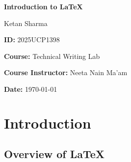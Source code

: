 \documentclass[12pt,a4paper]{report}
\begin{document}
	
	\begin{titlepage}
		\thispagestyle{empty}
		
		\begin{center}
			
			\vspace*{2cm}
			
			{\Huge\bfseries Introduction to LaTeX}
			
			\vspace{2cm}
			
			{\Large Ketan Sharma}
			
			\vspace{0.5cm}
			
			\textbf{ID:} 2025UCP1398
			
			\vspace{1.5cm}
			
			\textbf{Course:} Technical Writing Lab
			
			\vspace{0.5cm}
			
			\textbf{Course Instructor:} Neeta Nain Ma'am
			
			\vfill
			
			\textbf{Date:} \today
			
		\end{center}
		
	\end{titlepage}
	
	\pagestyle{fancy}
	
	\begin{abstract}
		
		This document provides an introduction to LaTeX, a document preparation system widely used for creating academic papers, technical reports, research articles and presentations. It explains the basic structure of a LaTeX document, formatting of chapters and sections, mathematical expressions, and the use of LaTeX for professional document preparation. It also demonstrates how to create a structured report with customized headings and page headers.
		
	\end{abstract}
	
	\tableofcontents
	
	\chapter{Introduction}
	
	\section{Overview of LaTeX}
	
\end{document}
